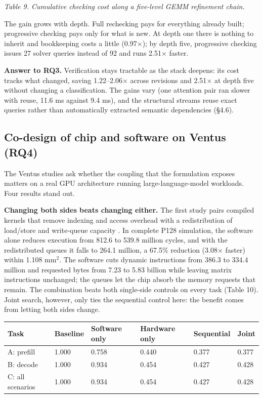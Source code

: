 \documentclass[11pt]{article}
\begin{document}
\emph{Table 9. Cumulative checking cost along a five-level GEMM refinement chain.}

The gain grows with depth. Full rechecking pays for everything already built; progressive checking pays only for what is new. At depth one there is nothing to inherit and bookkeeping costs a little (0.97\ensuremath{\times}); by depth five, progressive checking issues 27 solver queries instead of 92 and runs 2.51\ensuremath{\times} faster.

\textbf{Answer to RQ3.} Verification stays tractable as the stack deepens: its cost tracks what changed, saving 1.22--2.06\ensuremath{\times} across revisions and 2.51\ensuremath{\times} at depth five without changing a classification. The gains vary (one attention pair ran slower with reuse, 11.6 ms against 9.4 ms), and the structural streams reuse exact queries rather than automatically extracted semantic dependencies (§4.6).

\hypertarget{co-design-of-chip-and-software-on-ventus-rq4}{%
\subsection{Co-design of chip and software on Ventus (RQ4)}\label{co-design-of-chip-and-software-on-ventus-rq4}}

The Ventus studies ask whether the coupling that the formulation exposes matters on a real GPU architecture running large-language-model workloads. Four results stand out.

\textbf{Changing both sides beats changing either.} The first study pairs compiled kernels that remove indexing and access overhead with a redistribution of load/store and write-queue capacity \cite{r96}. In complete P128 simulation, the software alone reduces execution from 812.6 to 539.8 million cycles, and with the redistributed queues it falls to 264.1 million, a 67.5\% reduction (3.08\ensuremath{\times} faster) within 1.108 mm\ensuremath{^2}. The software cuts dynamic instructions from 386.3 to 334.4 million and requested bytes from 7.23 to 5.83 billion while leaving matrix instructions unchanged; the queues let the chip absorb the memory requests that remain. The combination beats both single-side controls on every task (Table 10). Joint search, however, only ties the sequential control here: the benefit comes from letting both sides change.

\begin{longtable}[]{@{}llllll@{}}
\toprule\noalign{}
Task & Baseline & Software only & Hardware only & Sequential & Joint \\
\midrule\noalign{}
\endhead
\bottomrule\noalign{}
\endlastfoot
A: prefill & 1.000 & 0.758 & 0.440 & 0.377 & 0.377 \\
B: decode & 1.000 & 0.934 & 0.454 & 0.427 & 0.428 \\
C: all scenarios & 1.000 & 0.934 & 0.454 & 0.427 & 0.428 \\
\end{longtable}
\end{document}
